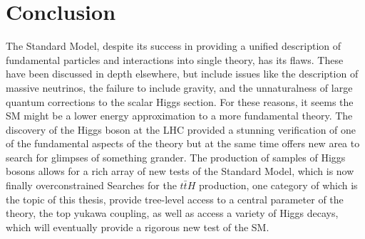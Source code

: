 \section{Conclusion}

The Standard Model, despite its success in providing a unified description of fundamental
particles and interactions into single theory, has its flaws. These have been discussed in 
depth elsewhere, but include issues like the description of massive neutrinos, the failure
to include gravity, and the unnaturalness of large quantum corrections to the scalar Higgs section.
For these reasons, it seems the SM might be a lower energy approximation to a more fundamental
theory. The discovery of the Higgs boson at the LHC provided a stunning verification of one
of the fundamental aspects of the theory but at the same time offers new area to search for
glimpses of something grander. The production of samples of Higgs bosons
allows for a rich array of new tests of the Standard Model, which is now finally overconstrained
Searches for the $t\bar{t}H$ production, one category of which is the topic
of this thesis, provide tree-level access to a central parameter of the theory, the top yukawa coupling,
as well as access a variety of Higgs decays, which will eventually provide a rigorous new 
test of the SM. 


